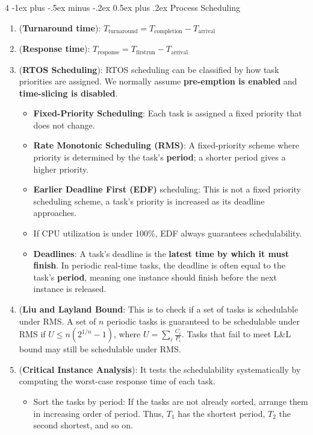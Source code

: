 \documentclass[10pt, landscape]{article}
\makeatletter
\renewcommand{\section}{\@startsection{section}{1}{0mm}%
                                {-1ex plus -.5ex minus -.2ex}%
                                {0.5ex plus .2ex}%
                                {\normalfont\large\bfseries}}
\makeatother
\begin{document}
\begin{multicols}{4}
\section{Process Scheduling}
\begin{enumerate}
    \item (\textbf{Turnaround time}): $T_{\text{turnaround}}=T_{\text{completion}}-T_{\text{arrival}}$
    \item (\textbf{Response time}): $T_{\text{response}}=T_{\text{firstrun}}-T_{\text{arrival}}$
    \item (\textbf{RTOS Scheduling}): RTOS scheduling can be classified by how task priorities are assigned. We normally assume \textbf{pre-emption is enabled} and \textbf{time-slicing is disabled}.
    \begin{itemize}
        \item \textbf{Fixed-Priority Scheduling}: Each task is assigned a fixed priority that does not change.
        \item \textbf{Rate Monotonic Scheduling (RMS)}: A fixed-priority scheme where priority is determined by the task's \textbf{period}; a shorter period gives a higher priority.
        \item \textbf{Earlier Deadline First (EDF)} scheduling: This is not a fixed priority scheduling scheme, a task's priority is increased as its deadline approaches.
        \item If CPU utilization is under 100\%, EDF always guarantees schedulability.
        \item \textbf{Deadlines}: A task's deadline is the \textbf{latest time by which it must finish}. In periodic real-time tasks, the deadline is often equal to the task's \textbf{period}, meaning one instance should finish before the next instance is released.
    \end{itemize}
    \item (\textbf{Liu and Layland Bound}: This is to check if a set of tasks is schedulable under RMS. A set of $n$ periodic tasks is guaranteed to be schedulable under RMS if $U \leq n\left(2^{1/n}-1\right)$, where $U=\sum_i\frac{C_i}{P_i}$. Tasks that fail to meet L\&L bound may still be schedulable under RMS.
    \item (\textbf{Critical Instance Analysis}): It tests the schedulability systematically by computing the worst-case response time of each task.
    \begin{itemize}
        \item Sort the tasks by period: If the tasks are not already sorted, arrange them in increasing order of period. Thus, $T_1$ has the shortest period, $T_2$ the second shortest, and so on.

\end{itemize}
\end{enumerate}
\end{multicols}
\end{document}
